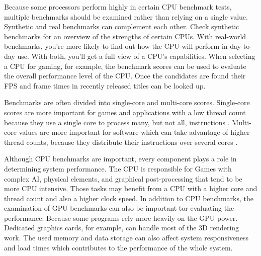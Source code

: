 Because some processors perform highly in certain CPU benchmark tests, multiple benchmarks should be examined rather than relying on a single value.
Synthetic and real benchmarks can complement each other. 
Check synthetic benchmarks for an overview of the strengths of certain CPUs. 
With real-world benchmarks, you're more likely to find out how the CPU will perform in day-to-day use. 
With both, you'll get a full view of a CPU's capabilities.
When selecting a CPU for gaming, for example, the benchmark scores can be used to evaluate the overall performance level of the CPU. Once the candidates are found  their FPS and frame times in recently released titles can be looked up.

Benchmarks are often divided into single-core and multi-core scores.
Single-core scores are more important for games and applications with a low thread count because they use a single core to process many, but not all, instructions \cite{Fromsing30:online}.
Multi-core values are more important for software which can take advantage of higher thread counts, because they distribute their instructions over several cores \cite{1110353543:online}.

Although CPU benchmarks are important, every component plays a role in determining system performance.
The CPU is responsible for Games with complex AI, physical elements, and graphical post-processing that tend to be more CPU intensive.
Those tasks may benefit from a CPU with a higher core and thread count and also a higher clock speed.
In addition to CPU benchmarks, the examination of GPU benchmarks can also be important tor evaluating the performance.
Because some programs rely more heavily on the GPU power.
Dedicated graphics cards, for example, can handle most of the 3D rendering work.
The used memory and data storage can also affect system responsiveness and load times which contributes to the performance of the whole system.





